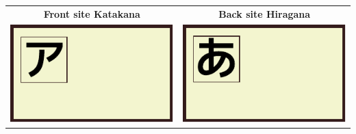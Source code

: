 \begin{center}
\begin{tabular}{cc}
\textbf{Front site Katakana}&\textbf{Back site Hiragana}\\
\includegraphics[scale=1.5]{../share/i/fcak.pdf}%
&
\includegraphics[scale=1.5]{../share/i/fcah.pdf}%
\\
\end{tabular}
\end{center}

